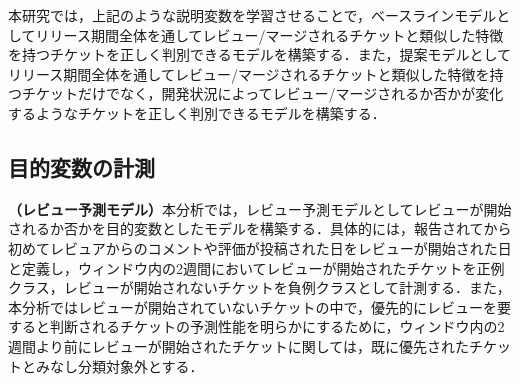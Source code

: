 \documentclass[submit]{ipsj}
\begin{document}
本研究では，上記のような説明変数を学習させることで，ベースラインモデルとしてリリース期間全体を通してレビュー/マージされるチケットと類似した特徴を持つチケットを正しく判別できるモデルを構築する．また，提案モデルとしてリリース期間全体を通してレビュー/マージされるチケットと類似した特徴を持つチケットだけでなく，開発状況によってレビュー/マージされるか否かが変化するようなチケットを正しく判別できるモデルを構築する．

\begin{table}[h]
  \caption{説明変数として計測する開発状況}
  \label{table:metrics_kaihatujoukyou}
  \centering
  \vspace{0.5zh}
\end{table}

\subsection{目的変数の計測}
\textbf{（レビュー予測モデル）}本分析では，レビュー予測モデルとしてレビューが開始されるか否かを目的変数としたモデルを構築する．具体的には，報告されてから初めてレビュアからのコメントや評価が投稿された日をレビューが開始された日と定義し，ウィンドウ内の2週間においてレビューが開始されたチケットを正例クラス，レビューが開始されないチケットを負例クラスとして計測する．また，本分析ではレビューが開始されていないチケットの中で，優先的にレビューを要すると判断されるチケットの予測性能を明らかにするために，ウィンドウ内の2週間より前にレビューが開始されたチケットに関しては，既に優先されたチケットとみなし分類対象外とする．

\end{document}
